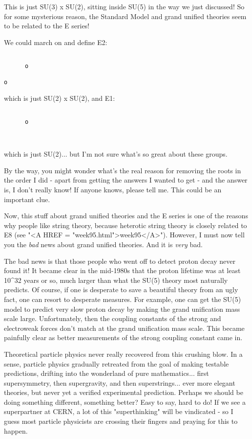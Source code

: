 This is just SU(3) x SU(2), sitting inside SU(5) in the way we just
discussed!  So for some mysterious reason, the Standard Model and
grand unified theories seem to be related to the E series!  

We could march on and define E2:


\begin{verbatim}

      o      
            
o

\end{verbatim}
    
which is just SU(2) x SU(2), and E1:


\begin{verbatim}

      o      
            


\end{verbatim}
    
which is just SU(2)... but I'm not sure what's so great about these
groups.  

By the way, you might wonder what's the real reason for removing the
roots in the order I did - apart from getting the answers I wanted to
get - and the answer is, I don't really know!  If anyone knows, please
tell me.  This could be an important clue.

Now, this stuff about grand unified theories and the E series is one
of the reasons why people like string theory, because heterotic string
theory is closely related to E8 (see "<A HREF =
"week95.html">week95</A>").  However, I must now tell you the
\emph{bad} news about grand unified theories.  And it is \emph{very} bad.

The bad news is that those people who went off to detect proton
decay never found it!  It became clear in the mid-1980s that the
proton lifetime was at least 10^{32} years or so, much larger than
what the SU(5) theory most naturally predicts.  Of course, if one is
desperate to save a beautiful theory from an ugly fact, one can resort
to desperate measures.  For example, one can get the SU(5) model to
predict very slow proton decay by making the grand unification mass
scale large.  Unfortunately, then the coupling constants of the strong
and electroweak forces don't match at the grand unification mass
scale.  This became painfully clear as better measurements of the
strong coupling constant came in.

Theoretical particle physics never really recovered from this crushing
blow.  In a sense, particle physics gradually retreated from the goal
of making testable predictions, drifting into the wonderland of pure
mathematics... first supersymmetry, then supergravity, and then
superstrings... ever more elegant theories, but never yet a verified
experimental prediction.  Perhaps we should be doing something
different, something better?  Easy to say, hard to do!  If we see a
superpartner at CERN, a lot of this "superthinking" will be
vindicated - so I guess most particle physicists are crossing their
fingers and praying for this to happen.

